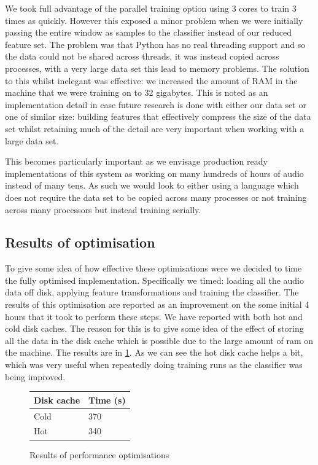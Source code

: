 \documentclass[ %
                    author={Sam Phippen},
                supervisor={Dr. Rafal Bogacz},
                     title={Real time voice activity detectors in noisy personal computing environments},
                  subtitle={},
                    degree={MEng},
                      year={2012} ]{thesis}
\begin{document}
We took full advantage of the parallel training option using 3 cores to train 3
times as quickly. However this exposed a minor problem when we were initially
passing the entire window as samples to the classifier instead of our reduced
feature set. The problem was that Python has no real threading support and so
the data could not be shared across threads, it was instead copied across
processes, with a very large data set this lead to memory problems. The
solution to this whilst inelegant was effective: we increased the amount of RAM
in the machine that we were training on to 32 gigabytes. This is noted as an
implementation detail in case future research is done with either our data set
or one of similar size: building features that effectively compress the size of
the data set whilst retaining much of the detail are very important when
working with a large data set.

This becomes particularly important as we envisage production ready
implementations of this system as working on many hundreds of hours of audio
instead of many tens. As such we would look to either using a language which
does not require the data set to be copied across many processes or not
training across many processors but instead training serially.

\subsection{Results of optimisation}

To give some idea of how effective these optimisations were we decided to time
the fully optimised implementation. Specifically we timed: loading all the
audio data off disk, applying feature transformations and training the
classifier. The results of this optimisation are reported as an improvement on
the some initial 4 hours that it took to perform these steps. We have reported
with both hot and cold disk caches. The reason for this is to give some idea of
the effect of storing all the data in the disk cache which is possible due to
the large amount of ram on the machine. The results are in
\ref{table:optimisation-results}. As we can see the hot disk cache helps a bit,
which was very useful when repeatedly doing training runs as the classifier was
being improved.

\begin{figure}
    \begin{tabular}{|l|l|}
        Disk cache & Time (s) \\ \hline
        Cold & 370 \\
        Hot &  340 \\
    \end{tabular}
    \caption{Results of performance optimisations}

    \label{table:optimisation-results}
\end{figure}
\end{document}
